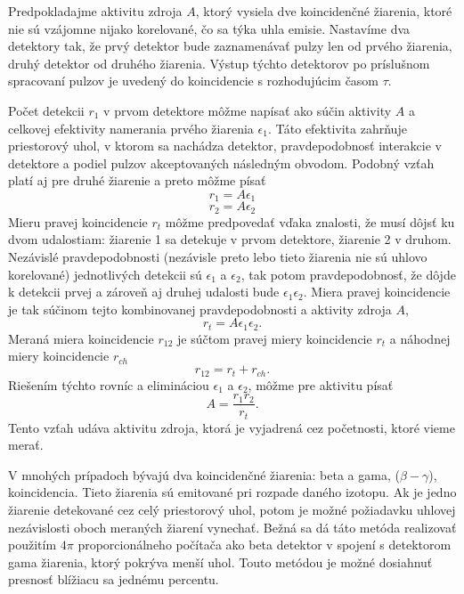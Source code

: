 \documentclass[../../main.tex]{subfiles}
\begin{document}
Predpokladajme aktivitu zdroja $A$, ktorý vysiela dve koincidenčné žiarenia, ktoré nie sú vzájomne nijako korelované, čo sa týka uhla emisie. Nastavíme dva detektory tak, že prvý detektor bude zaznamenávať pulzy len od prvého žiarenia, druhý detektor od druhého žiarenia. Výstup týchto detektorov po príslušnom spracovaní pulzov je uvedený do koincidencie s rozhodujúcim časom $\tau$. 

Počet detekcii $r_1$ v prvom detektore môžme napísať ako súčin aktivity $A$ a celkovej efektivity namerania prvého žiarenia $\epsilon_1$. Táto efektivita zahrňuje priestorový uhol, v ktorom sa nachádza detektor, pravdepodobnosť interakcie v detektore a podiel pulzov akceptovaných následným obvodom. Podobný vzťah platí aj pre druhé žiarenie a preto môžme písať
$$ r_1 = A \epsilon_1 $$ 
$$ r_2 = A \epsilon_2 $$
Mieru pravej koincidencie $r_t$ môžme predpovedať vďaka znalosti, že musí dôjsť ku dvom udalostiam: žiarenie 1 sa detekuje v prvom detektore, žiarenie 2 v druhom. Nezávislé pravdepodobnosti (nezávisle preto lebo tieto žiarenia nie sú uhlovo korelované) jednotlivých detekcii sú $\epsilon_1$ a $\epsilon_2$, tak potom pravdepodobnosť, že dôjde k detekcii prvej a zároveň aj druhej udalosti bude $\epsilon_1 \epsilon_2$. Miera pravej koincidencie je tak súčinom tejto kombinovanej pravdepodobnosti a aktivity zdroja $A$,
$$ r_t = A \epsilon_1 \epsilon_2.$$
Meraná miera koincidencie $r_{12}$ je súčtom pravej miery koincidencie $r_t$ a náhodnej miery koincidencie $r_{ch}$
$$ r_{12} = r_t + r_{ch}.$$
Riešením týchto rovníc a elimináciou $\epsilon_1$ a $\epsilon_2$, môžme pre aktivitu písať 
$$ A = \frac{r_1 r_2}{r_t}.$$
Tento vzťah udáva aktivitu zdroja, ktorá je vyjadrená cez početnosti, ktoré vieme merať.

V mnohých prípadoch bývajú dva koincidenčné žiarenia: beta a gama, ($\beta-\gamma$), koincidencia. Tieto žiarenia sú emitované pri rozpade daného izotopu. Ak je jedno žiarenie detekované cez celý priestorový uhol, potom je možné požiadavku uhlovej nezávislosti oboch meraných žiarení vynechať. Bežná sa dá táto metóda realizovať použitím $4\pi$ proporcionálneho počítača ako beta detektor v spojení s detektorom gama žiarenia, ktorý pokrýva menší uhol. Touto metódou je možné dosiahnuť presnosť blížiacu sa jednému percentu.
\end{document}
